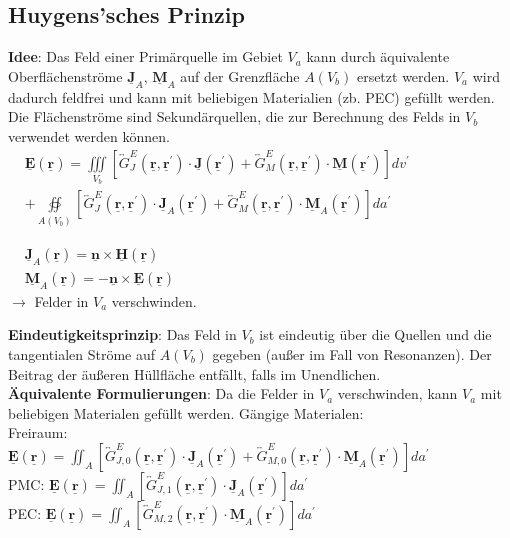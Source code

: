 \documentclass[english]{latex4ei/latex4ei_sheet}
\renewcommand{\vec}[1]{\underline{\boldsymbol{#1}}}
\begin{document}
\begin{sectionbox}
	\subsection{Huygens'sches Prinzip}
	\textbf{Idee}: Das Feld einer Primärquelle im Gebiet $V_a$ kann durch äquivalente Oberflächenströme $\vec{J}_A$, $\vec{M}_A$ auf der Grenzfläche $A(V_b)$ ersetzt werden. $V_a$ wird dadurch feldfrei und kann mit beliebigen Materialien (zb. PEC) gefüllt werden. Die Flächenströme sind Sekundärquellen, die zur Berechnung des Felds in $V_b$ verwendet werden können.\\
	$\begin{aligned}
		&\vec{E}(\vec{r})=\iiint\limits_{V_{b}}\left[\overleftrightarrow{G}_{J}^{E}\left(\vec{r}, \vec{r}^{\prime}\right) \cdot \vec{J}\left(\vec{r}^{\prime}\right)+\overleftrightarrow{G}_{M}^{E}\left(\vec{r}, \vec{r}^{\prime}\right) \cdot \vec{M}\left(\vec{r}^{\prime}\right)\right] d v^{\prime} \\
		&+\oiint\limits_{A\left(V_{b}\right)}\left[\overleftrightarrow{G}_{J}^{E}\left(\vec{r}, \vec{r}^{\prime}\right) \cdot \vec{J}_{A}\left(\vec{r}^{\prime}\right)+\overleftrightarrow{G}_{M}^{E}\left(\vec{r}, \vec{r}^{\prime}\right) \cdot \vec{M}_{A}\left(\vec{r}^{\prime}\right)\right] d a^{\prime}
		\end{aligned}$\\
	\begin{emphbox}
		$\begin{aligned}
			&\vec{J}_{A}\left(\vec{r}\right)=\vec{n} \times \vec{H}\left(\vec{r}\right) \\
			&\vec{M}_{A}\left(\vec{r}\right)=-\vec{n} \times \vec{E}\left(\vec{r}\right)
		\end{aligned}$\\
		$\rightarrow$ Felder in $V_a$ verschwinden.
	\end{emphbox}
	\textbf{Eindeutigkeitsprinzip}: Das Feld in $V_b$ ist eindeutig über die Quellen und die tangentialen Ströme auf $A(V_b)$ gegeben (außer im Fall von Resonanzen). Der Beitrag der äußeren Hüllfläche entfällt, falls im Unendlichen.\\
	
	\textbf{Äquivalente Formulierungen}: Da die Felder in $V_a$ verschwinden, kann $V_a$ mit beliebigen Materialen gefüllt werden. Gängige Materialen:\\
	Freiraum:\\
	$\vec{E}(\vec{r})=\iint_{A}\left[\overleftrightarrow{G}_{J, 0}^{E}\left(\vec{r}, \vec{r}^{\prime}\right) \cdot \vec{J}_{A}\left(\vec{r}^{\prime}\right)+\overleftrightarrow{G}_{M, 0}^{E}\left(\vec{r}, \vec{r}^{\prime}\right) \cdot \vec{M}_{A}\left(\vec{r}^{\prime}\right)\right] d a^{\prime}$\\
	PMC: $\vec{E}(\vec{r})=\iint_{A}\left[\overleftrightarrow{G}_{J, 1}^{E}\left(\vec{r}, \vec{r}^{\prime}\right) \cdot \vec{J}_{A}\left(\vec{r}^{\prime}\right)\right] d a^{\prime}$\\
	PEC: $\vec{E}(\vec{r})=\iint_{A}\left[\overleftrightarrow{G}_{M, 2}^{E}\left(\vec{r}, \vec{r}^{\prime}\right) \cdot \vec{M}_{A}\left(\vec{r}^{\prime}\right)\right] d a^{\prime}$\\
	

\end{sectionbox}
\end{document}

